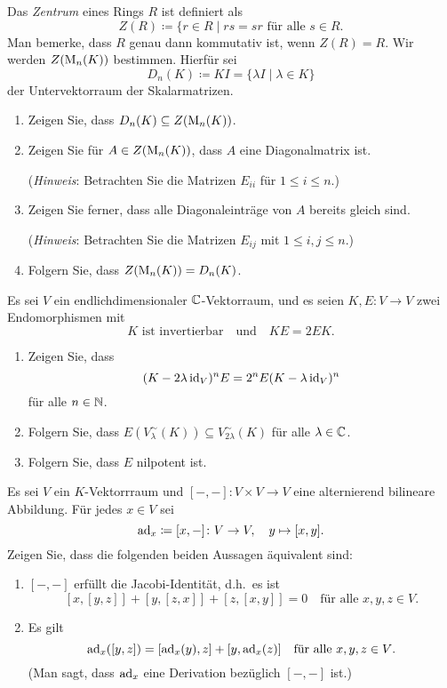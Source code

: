 \documentclass[a4paper,10pt]{scrartcl}
\begin{document}
\begin{question}
  Das \emph{Zentrum} eines Rings $R$ ist definiert als
  \[
    Z(R) \coloneqq \{r \in R \mid \text{$rs = sr$ für alle $s \in R$}.
  \]
  Man bemerke, dass $R$ genau dann kommutativ ist, wenn $Z(R) = R$.
  Wir werden $Z(\operatorname{M}_n(K))$ bestimmen.
  Hierfür sei
  \[
    D_n(K) \coloneqq K I = \{\lambda I \mid \lambda \in K\}
  \]
  der Untervektorraum der Skalarmatrizen.
  \begin{enumerate}[leftmargin=*]
    \item
      Zeigen Sie, dass $D_n(K) \subseteq Z(\operatorname{M}_n(K))$.
    \item
      Zeigen Sie für $A \in Z(\operatorname{M}_n(K))$, dass $A$ eine Diagonalmatrix ist.
      
      (\emph{Hinweis}:
       Betrachten Sie die Matrizen $E_{ii}$ für $1 \leq i \leq n$.)
    \item
      Zeigen Sie ferner, dass alle Diagonaleinträge von $A$ bereits gleich sind.
      
      (\emph{Hinweis}:
       Betrachten Sie die Matrizen $E_{ij}$ mit $1 \leq i,j \leq n$.)
    \item
      Folgern Sie, dass $Z(\operatorname{M}_n(K)) = D_n(K)$.
  \end{enumerate}
\end{question}


\begin{question}
  Es sei $V$ ein endlichdimensionaler $\mathbb{C}$-Vektorraum, und es seien $K, E \colon V \to V$ zwei Endomorphismen mit
  \[
    \text{$K$ ist invertierbar}
    \quad\text{und}\quad
    KE = 2EK.
  \]
  \begin{enumerate}[leftmargin=*]
    \item
      Zeigen Sie, dass
      \[
        (K - 2 \lambda \operatorname{id}_V)^n E = 2^n E (K - \lambda \operatorname{id}_V)^n
      \]
      für alle $n \in \mathbb{N}$.
    \item
      Folgern Sie, dass $E( V^\sim_\lambda(K) ) \subseteq V^\sim_{2\lambda}(K)$ für alle $\lambda \in \mathbb{C}$.
    \item
      Folgern Sie, dass $E$ nilpotent ist.
  \end{enumerate}
\end{question}


\begin{question}
  Es sei $V$ ein $K$-Vektorrraum und $[-,-] \colon V \times V \to V$ eine alternierend bilineare Abbildung.
  Für jedes $x \in V$ sei
  \[
    \operatorname{ad}_x \coloneqq [x,-] \colon V \to V, \quad y \mapsto [x,y].
  \]
  Zeigen Sie, dass die folgenden beiden Aussagen äquivalent sind:
  \begin{enumerate}
    \item
      $[-,-]$ erfüllt die Jacobi-Identität, d.h.\ es ist
      \[
        [x,[y,z]] + [y,[z,x]] + [z,[x,y]] = 0
        \quad
        \text{für alle $x, y, z \in V$}.
      \]
    \item
      Es gilt
      \[
          \operatorname{ad}_x([y,z])
        = [\operatorname{ad}_x(y), z] + [y, \operatorname{ad}_x(z)]
        \quad
        \text{für alle $x, y, z \in V$}.
      \]
      (Man sagt, dass $\operatorname{ad}_x$ eine Derivation bezüglich $[-,-]$ ist.)
  \end{enumerate}
\end{question}
\end{document}
